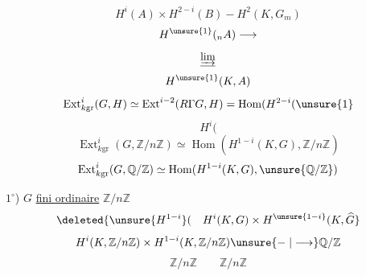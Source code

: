 \[
\boxed{H^i(A)\times H^{2-i}(B)\mathrel{-}H^2(K,G_m)}
\]
\[
H^{\unsure{1}}({}_nA)\longrightarrow
\]
\[
\underline{\varinjlim}
\]
\[
H^{\unsure{1}}(K,A)
\]
\[
\operatorname{Ext}^i_{k\mathrm{gr}}(G,H)\simeq
\operatorname{Ext}^{i-2}(R\Gamma G,H)=\operatorname{Hom}(H^{2-i}(\unsure{1}
\]
\[
H^i(
\]
\[
\operatorname{Ext}^i_{k\mathrm{gr}}(G,\mathbb Z/n\mathbb Z)\simeq
\operatorname{Hom}(H^{1-i}(K,G),\mathbb Z/n\mathbb Z)
\]
\[
\operatorname{Ext}^i_{k\mathrm{gr}}(G,\mathbb Q/\mathbb Z)\simeq
\operatorname{Hom}(H^{1-i}(K,G),\unsure{\mathbb Q/\mathbb Z})
\]

\uline{$1^\circ$}) $G$ \uline{ fini ordinaire} $\mathbb Z/n\mathbb Z$
\[
\deleted{\unsure{H^{1-i}}(\quad H^i(K,G)\times H^{\unsure{1-i}}(K,\widehat G}
\]
\[
H^i(K,\mathbb Z/n\mathbb Z)\times H^{1-i}(K,\mathbb Z/n\mathbb Z)
\unsure{\mathrel{-}|\longrightarrow}\mathbb Q/\mathbb Z
\]
\[
\mathbb Z/n\mathbb Z\qquad\mathbb Z/n\mathbb Z
\]

